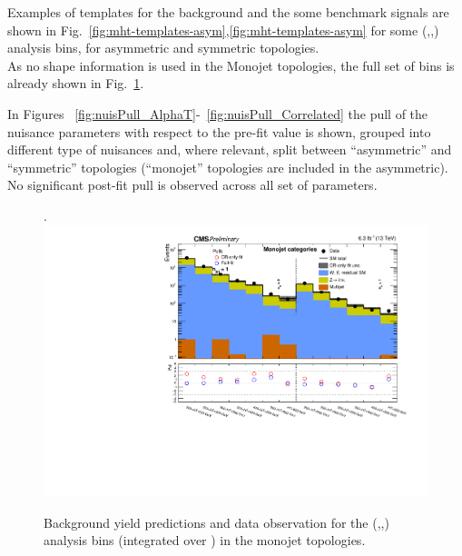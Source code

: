 Examples of \mht templates for the background and the some benchmark signals are shown in Fig.~\ref{fig:mht-templates-asym},\ref{fig:mht-templates-asym}  
for some (\njet,\nb,\scalht) analysis bins, for asymmetric and symmetric topologies. \\
As no \MHT shape information is used in the Monojet topologies, the full set of bins is already shown in Fig.~\ref{fig:summaryPlot_Monojet}. 

In Figures ~\ref{fig:nuisPull_AlphaT}-~\ref{fig:nuisPull_Correlated} the pull 
of the nuisance parameters with respect to the pre-fit value is shown, 
grouped into different type of nuisances and, where relevant, 
split between ``asymmetric'' and ``symmetric'' topologies 
(``monojet'' topologies are included in the asymmetric). \\
No significant post-fit pull is observed across all set of parameters. 



\clearpage

\clearpage

\clearpage


\clearpage

\clearpage

\clearpage





\clearpage
\begin{landscape}
  \begin{center}
    \begin{figure}[h!]
      \caption{Background yield predictions and data observation for the (\njet,\nb,\scalht) analysis bins (integrated over \MHT) in the monojet topologies. \label{fig:summaryPlot_Monojet}}.
      \includegraphics[width=0.8\linewidth]{figures/postFitResults/summaryPlots/summaryPlot_Monojet_prefit_overlay_fit_b_CRFit}
    \end{figure}
  \end{center}
\end{landscape}

